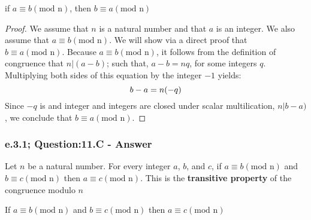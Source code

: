 \begin{tcolorbox}
	\begin{theorem}
		if $a \equiv b (\text{mod n})$, then $b \equiv a (\text{mod n})$
	\end{theorem}
\end{tcolorbox}

\begin{proof}
We assume that $n$ is a natural number and that $a$ is an integer. We also assume that $a \equiv b (\text{mod n})$. We will show via a direct proof that $b \equiv a (\text{mod n})$. Because $a \equiv b (\text{mod n})$, it follows from the definition of congruence that $n|(a-b)$; such that, $a-b = nq$, for some integers $q$. Multiplying both sides of this equation by the integer $-1$ yields: 
	\begin{equation}
		b-a = n(-q) \nonumber \\
	\end{equation}
Since $-q$ is and integer and integers are closed under scalar multilication, $n | b-a)$, we conclude that $b \equiv a (\text{mod n})$. 
\end{proof}



\subsubsection*{e.3.1; Question:11.C - Answer}
Let $n$ be a natural number. For every integer $a$, $b$, and $c$, if $a \equiv b (\text{mod n})$ and $b \equiv c (\text{mod n})$ then $a \equiv c (\text{mod n})$. This is the {\bf transitive property} of the congruence modulo $n$

\begin{tcolorbox}
	\begin{theorem}
		If $a \equiv b (\text{mod n})$ and $b \equiv c (\text{mod n})$ then $a \equiv c (\text{mod n})$
	\end{theorem}
\end{tcolorbox}

